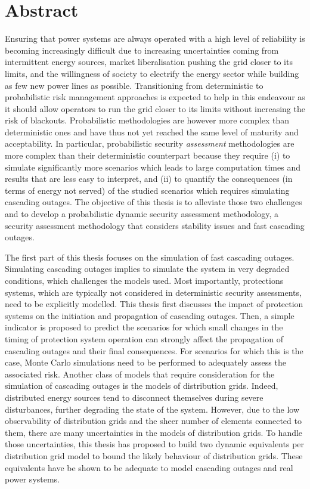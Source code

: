 \chapter*{Abstract}

Ensuring that power systems are always operated with a high level of reliability is becoming increasingly difficult due to increasing uncertainties coming from intermittent energy sources, market liberalisation pushing the grid closer to its limits, and the willingness of society to electrify the energy sector while building as few new power lines as possible. Transitioning from deterministic to probabilistic risk management approaches is expected to help in this endeavour as it should allow operators to run the grid closer to its limits without increasing the risk of blackouts. Probabilistic methodologies are however more complex than deterministic ones and have thus not yet reached the same level of maturity and acceptability. In particular, probabilistic security \emph{assessment} methodologies are more complex than their deterministic counterpart because they require (i) to simulate significantly more scenarios which leads to large computation times and results that are less easy to interpret, and (ii) to quantify the consequences (\eg in terms of energy not served) of the studied scenarios which requires simulating cascading outages. The objective of this thesis is to alleviate those two challenges and to develop a probabilistic dynamic security assessment methodology, \ie a security assessment methodology that considers stability issues and fast cascading outages.

The first part of this thesis focuses on the simulation of fast cascading outages. Simulating cascading outages implies to simulate the system in very degraded conditions, which challenges the models used. Most importantly, protections systems, which are typically not considered in deterministic security assessments, need to be explicitly modelled. This thesis first discusses the impact of protection systems on the initiation and propagation of cascading outages. Then, a simple indicator is proposed to predict the scenarios for which small changes in the timing of protection system operation can strongly affect the propagation of cascading outages and their final consequences. For scenarios for which this is the case, Monte Carlo simulations need to be performed to adequately assess the associated risk. Another class of models that require consideration for the simulation of cascading outages is the models of distribution grids. Indeed, distributed energy sources tend to disconnect themselves during severe disturbances, further degrading the state of the system. However, due to the low observability of distribution grids and the sheer number of elements connected to them, there are many uncertainties in the models of distribution grids. To handle those uncertainties, this thesis has proposed to build two dynamic equivalents per distribution grid model to bound the likely behaviour of distribution grids. These equivalents have be shown to be adequate to model cascading outages and real power systems.

